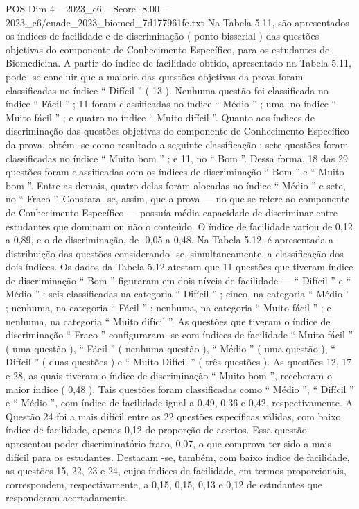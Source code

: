 \begin{textsample}{POS Dim 4 – 2023\_c6 – Score -8.00 – 2023\_c6/enade\_2023\_biomed\_7d177961fe.txt}
Na Tabela 5.11, são apresentados os índices de facilidade e de discriminação ( ponto-bisserial ) das questões objetivas do componente de Conhecimento Específico, para os estudantes de Biomedicina.
A partir do índice de facilidade obtido, apresentado na Tabela 5.11, pode -se concluir que a maioria das questões objetivas da prova foram classificadas no índice “ Difícil ” ( 13 ).
Nenhuma questão foi classificada no índice “ Fácil ” ; 11 foram classificadas no índice “ Médio ” ; uma, no índice “ Muito fácil ” ; e quatro no índice “ Muito difícil ”.
Quanto aos índices de discriminação das questões objetivas do componente de Conhecimento Específico da prova, obtém -se como resultado a seguinte classificação : sete questões foram classificadas no índice “ Muito bom ” ; e 11, no “ Bom ”.
Dessa forma, 18 das 29 questões foram classificadas com os índices de discriminação “ Bom ” e “ Muito bom ”.
Entre as demais, quatro delas foram alocadas no índice “ Médio ” e sete, no “ Fraco ”.
Constata -se, assim, que a prova — no que se refere ao componente de Conhecimento Específico — possuía média capacidade de discriminar entre estudantes que dominam ou não o conteúdo.
O índice de facilidade variou de 0,12 a 0,89, e o de discriminação, de -0,05 a 0,48.
Na Tabela 5.12, é apresentada a distribuição das questões considerando -se, simultaneamente, a classificação dos dois índices.
Os dados da Tabela 5.12 atestam que 11 questões que tiveram índice de discriminação “ Bom ” figuraram em dois níveis de facilidade — “ Difícil ” e “ Médio ” : seis classificadas na categoria “ Difícil ” ; cinco, na categoria “ Médio ” ; nenhuma, na categoria “ Fácil ” ; nenhuma, na categoria “ Muito fácil ” ; e nenhuma, na categoria “ Muito difícil ”.
As questões que tiveram o índice de discriminação “ Fraco ” configuraram -se com índices de facilidade “ Muito fácil ” ( uma questão ), “ Fácil ” ( nenhuma questão ), “ Médio ” ( uma questão ), “ Difícil ” ( duas questões ) e “ Muito Difícil ” ( três questões ).
As questões 12, 17 e 28, as quais tiveram o índice de discriminação “ Muito bom ”, receberam o maior índice ( 0,48 ).
Tais questões foram classificadas como “ Médio ”, “ Difícil ” e “ Médio ”, com índice de facilidade igual a 0,49, 0,36 e 0,42, respectivamente.
A Questão 24 foi a mais difícil entre as 22 questões específicas válidas, com baixo índice de facilidade, apenas 0,12 de proporção de acertos.
Essa questão apresentou poder discriminatório fraco, 0,07, o que comprova ter sido a mais difícil para os estudantes.
Destacam -se, também, com baixo índice de facilidade, as questões 15, 22, 23 e 24, cujos índices de facilidade, em termos proporcionais, correspondem, respectivamente, a 0,15, 0,15, 0,13 e 0,12 de estudantes que responderam acertadamente.

\end{textsample}
